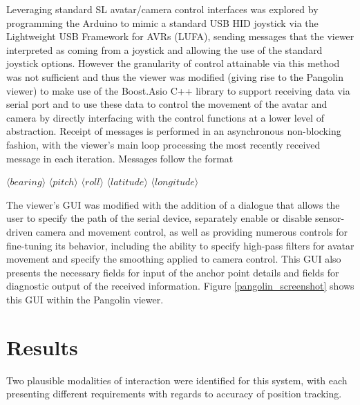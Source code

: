 Leveraging standard SL avatar/camera control interfaces was explored by programming the Arduino to mimic a standard USB HID joystick via the Lightweight USB Framework for AVRs (LUFA), sending messages that the viewer interpreted as coming from a joystick and allowing the use of the standard joystick options. However the granularity of control attainable via this method was not sufficient and thus the viewer was modified (giving rise to the Pangolin viewer) to make use of the Boost.Asio C++ library to support receiving data via serial port and to use these data to control the movement of the avatar and camera by directly interfacing with the control functions at a lower level of abstraction. Receipt of messages is performed in an asynchronous non-blocking fashion, with the viewer's main loop processing the most recently received message in each iteration. Messages follow the format

$\langle bearing \rangle$ $\langle pitch \rangle$ $\langle roll \rangle$ $\langle latitude \rangle$ $\langle longitude \rangle$

The viewer's GUI was modified with the addition of a dialogue that allows the user to specify the path of the serial device, separately enable or disable sensor-driven camera and movement control, as well as providing numerous controls for fine-tuning its behavior, including the ability to specify high-pass filters for avatar movement and specify the smoothing applied to camera control. This GUI also presents the necessary fields for input of the anchor point details and fields for diagnostic output of the received information. Figure \ref{pangolin_screenshot} shows this GUI within the Pangolin viewer.


\section{Results}
Two plausible modalities of interaction were identified for this system, with each presenting different requirements with regards to accuracy of position tracking.

